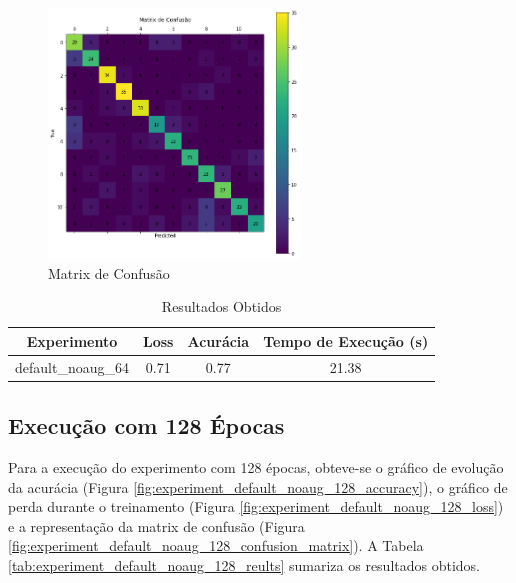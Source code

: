 \documentclass[12pt]{article}
\begin{document}
\begin{figure}[!htb]
  \centering
  \includegraphics[width=18em]{experiments/default_noaug_64/confusion_matrix.png}
  \caption{Matrix de Confusão}
  \label{fig:experiment_default_noaug_64_confusion_matrix}
\end{figure}

\begin{table}[!htb]
  \centering
  \begin{tabular}{|c|c|c|c|}
    \hline
    \textbf{Experimento} & \textbf{Loss} & \textbf{Acurácia} & \textbf{Tempo de Execução (s)} \\ \hline
    default\_noaug\_64   & 0.71          & 0.77              & 21.38                          \\ \hline
  \end{tabular}
  \caption{Resultados Obtidos}
  \label{tab:experiment_default_noaug_64_reults}
\end{table}

\newpage

\subsection{Execução com 128 Épocas}

Para a execução do experimento com 128 épocas, obteve-se o gráfico de evolução da acurácia (Figura \ref{fig:experiment_default_noaug_128_accuracy}), o gráfico de perda durante o treinamento (Figura \ref{fig:experiment_default_noaug_128_loss}) e a representação da matrix de confusão (Figura \ref{fig:experiment_default_noaug_128_confusion_matrix}). A Tabela \ref{tab:experiment_default_noaug_128_reults} sumariza os resultados obtidos.
\end{document}
